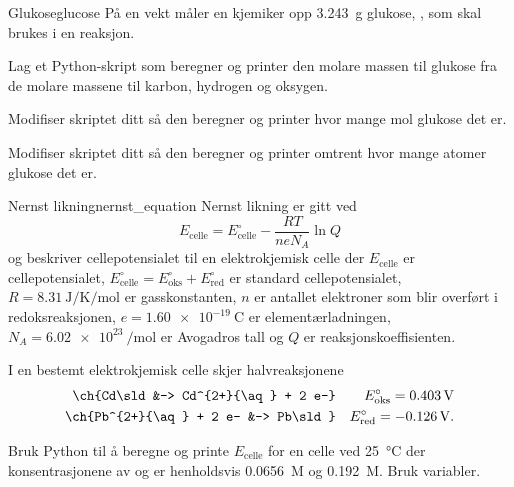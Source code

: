 
\exercisechapter
	
\begin{exercise}{Glukose}{glucose}
	På en vekt måler en kjemiker opp \SI{3,243}{\gram} glukose, , som skal brukes i en reaksjon.
	
	\subexercise Lag et Python-skript som beregner og printer den molare massen til glukose fra de molare massene til karbon, hydrogen og oksygen.
	
	\subexercise Modifiser skriptet ditt så den beregner og printer hvor mange mol glukose det er.
	
	\subexercise Modifiser skriptet ditt så den beregner og printer omtrent hvor mange atomer glukose det er.
\end{exercise}

\begin{exercise}{Nernst likning}{nernst_equation}
	Nernst likning er gitt ved
	\begin{equation*}
		E_\mathrm{celle}=E^\circ_\mathrm{celle}-\frac{RT}{neN_A}\ln Q
	\end{equation*}
	og beskriver cellepotensialet til en elektrokjemisk celle der $E_\mathrm{celle}$ er cellepotensialet, $E^\circ_\mathrm{celle}=E^\circ_\mathrm{oks}+E^\circ_\mathrm{red}$ er standard cellepotensialet, $R=\SI{8.31}{\joule\per\kelvin\per\mole}$ er gasskonstanten, $n$ er antallet elektroner som blir overført i redoksreaksjonen, $e=\SI{1.60e-19}{\coulomb}$ er elementærladningen, $N_A=\SI{6.02e23}{\per\mole}$ er Avogadros tall og $Q$ er reaksjonskoeffisienten.
	
	I en bestemt elektrokjemisk celle skjer halvreaksjonene
	\begin{align*}
		\ch{Cd\sld &-> Cd^{2+}{\aq} + 2 e-} &&E^\circ_\mathrm{oks}=\SI{0,403}{\volt}\\
		\ch{Pb^{2+}{\aq} + 2 e- &-> Pb\sld} &&E^\circ_\mathrm{red}=\SI{-0.126}{\volt}. 
	\end{align*}
	
	Bruk Python til å beregne og printe $E_\mathrm{celle}$ for en celle ved \SI{25}{\celsius} der konsentrasjonene av  og  er henholdsvis \SI{0,0656}{M} og \SI{0,192}{M}. Bruk variabler.
\end{exercise}

